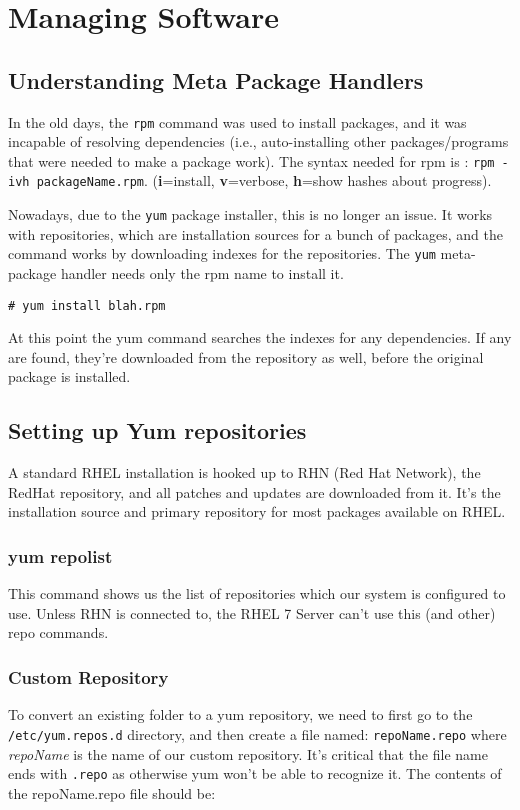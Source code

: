 \chapter{Managing Software}
\section{Understanding Meta Package Handlers}
In the old days, the \verb|rpm| command was used to install packages, and it was incapable of resolving dependencies (i.e., auto-installing other packages/programs that were needed to make a package work). The syntax needed for rpm is : \verb|rpm -ivh packageName.rpm|. (\textbf{i}=install, \textbf{v}=verbose, \textbf{h}=show hashes about progress).

Nowadays, due to the \verb|yum| package installer, this is no longer an issue. It works with repositories, which are installation sources for a bunch of packages, and the command works by downloading indexes for the repositories. The \verb|yum| meta-package handler needs only the rpm name to install it. 

\vspace{-15pt}
\begin{verbatim}
# yum install blah.rpm
\end{verbatim}
\vspace{-10pt}

At this point the yum command searches the indexes for any dependencies. If any are found, they're downloaded from the repository as well, before the original package is installed.

	\section{Setting up Yum repositories} 
A standard RHEL installation is hooked up to RHN (Red Hat Network), the RedHat repository, and all patches and updates are downloaded from it. It's the installation source and primary repository for most packages available on RHEL. 

\subsection{yum repolist}
This command shows us the list of repositories which our system is configured to use. Unless RHN is connected to, the RHEL 7 Server can't use this (and other) repo commands. 

\subsection{Custom Repository}
To convert an existing folder to a yum repository, we need to first go to the \verb|/etc/yum.repos.d| directory, and then create a file named: \verb|repoName.repo| where \textit{repoName} is the name of our custom repository. It's critical that the file name ends with \verb|.repo| as otherwise yum won't be able to recognize it. The contents of the repoName.repo file should be:

